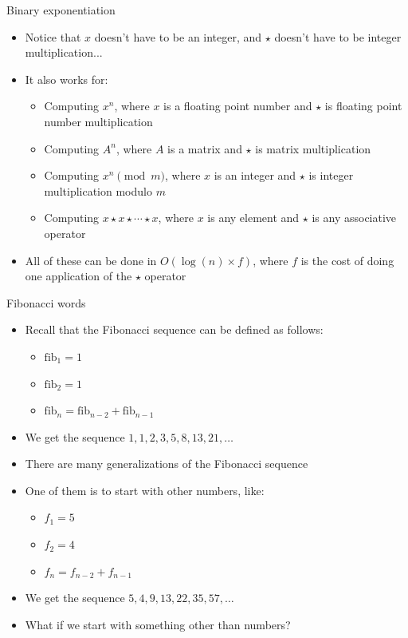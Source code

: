 \documentclass{beamer}
\begin{document}
\begin{frame}[plain]{Binary exponentiation}
    \begin{itemize}
        \item Notice that $x$ doesn't have to be an integer, and $\star$ doesn't have to be integer multiplication...
        \item It also works for:
            \begin{itemize}
                \item Computing $x^n$, where $x$ is a floating point number and $\star$ is floating point number multiplication
                \item Computing $A^n$, where $A$ is a matrix and $\star$ is matrix multiplication
                \item Computing $x^n \pmod{m}$, where $x$ is an integer and $\star$ is integer multiplication modulo $m$
                \item Computing $x\star x\star \cdots \star x$, where $x$ is any element and $\star$ is any associative operator
            \end{itemize}

        \item All of these can be done in $O(\log(n) \times f)$, where $f$ is the cost of doing one application of the $\star$ operator
    \end{itemize}
\end{frame}

\begin{frame}[plain]{Fibonacci words}
    \begin{itemize}
        \item Recall that the Fibonacci sequence can be defined as follows:
            \begin{itemize}
        \item $\mathrm{fib}_1 = 1$
        \item $\mathrm{fib}_2 = 1$
        \item $\mathrm{fib}_n = \mathrm{fib}_{n-2} + \mathrm{fib}_{n-1}$
            \end{itemize}
        \item We get the sequence $1, 1, 2, 3, 5, 8, 13, 21, \ldots$
        \item There are many generalizations of the Fibonacci sequence
        \item One of them is to start with other numbers, like:
            \begin{itemize}
                \item $f_1 = 5$
                \item $f_2 = 4$
                \item $f_n = f_{n-2} + f_{n-1}$
            \end{itemize}
        \item We get the sequence $5, 4, 9, 13, 22, 35, 57, \ldots$
        \item What if we start with something other than numbers?
    \end{itemize}
\end{frame}
\end{document}
